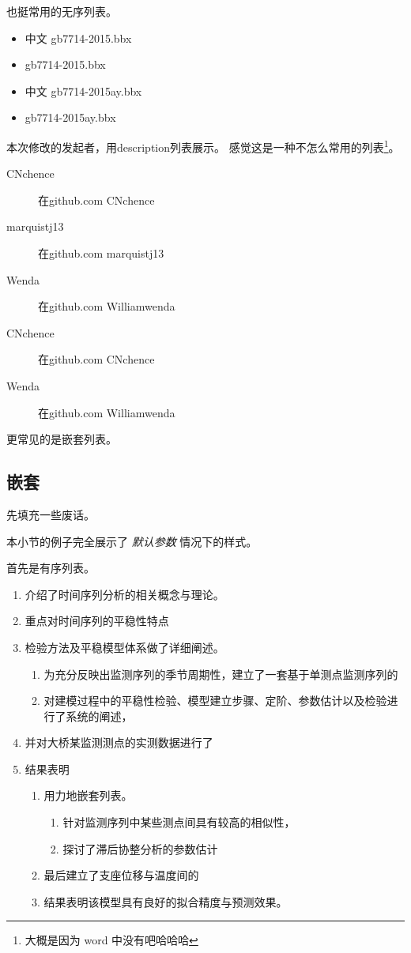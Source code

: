 \documentclass[../Main/thesis]{subfiles}
\begin{document}
也挺常用的无序列表。

\begin{itemize}
  \item 中文 gb7714-2015.bbx
  \item gb7714-2015.bbx
  \item 中文 gb7714-2015ay.bbx
  \item gb7714-2015ay.bbx
\end{itemize}

本次修改的发起者，用description列表展示。
感觉这是一种不怎么常用的列表\footnote{大概是因为 word 中没有吧哈哈哈}。

\begin{description}
  \item[CNchence] 在github.com CNchence
  \item[marquistj13] 在github.com marquistj13
  \item[Wenda] 在github.com Williamwenda
  \item[CNchence] 在github.com CNchence
  \item[Wenda] 在github.com Williamwenda
\end{description}

更常见的是嵌套列表。

\subsection{嵌套}

先填充一些废话。\zhlipsum[6]

本小节的例子完全展示了 \emph{默认参数} 情况下的样式。

首先是有序列表。
\begin{enumerate}
  \item 介绍了时间序列分析的相关概念与理论。
  \item 重点对时间序列的平稳性特点
  \item 检验方法及平稳模型体系做了详细阐述。
  \begin{enumerate}
    \item 为充分反映出监测序列的季节周期性，建立了一套基于单测点监测序列的
    \item 对建模过程中的平稳性检验、模型建立步骤、定阶、参数估计以及检验进行了系统的阐述，
  \end{enumerate}
  \item 并对大桥某监测测点的实测数据进行了
  \item 结果表明
  \begin{enumerate}
    \item 用力地嵌套列表。
    \begin{enumerate}
      \item 针对监测序列中某些测点间具有较高的相似性，
      \item 探讨了滞后协整分析的参数估计
    \end{enumerate}
    \item 最后建立了支座位移与温度间的
    \item 结果表明该模型具有良好的拟合精度与预测效果。
  \end{enumerate}
\end{enumerate}
\end{document}
